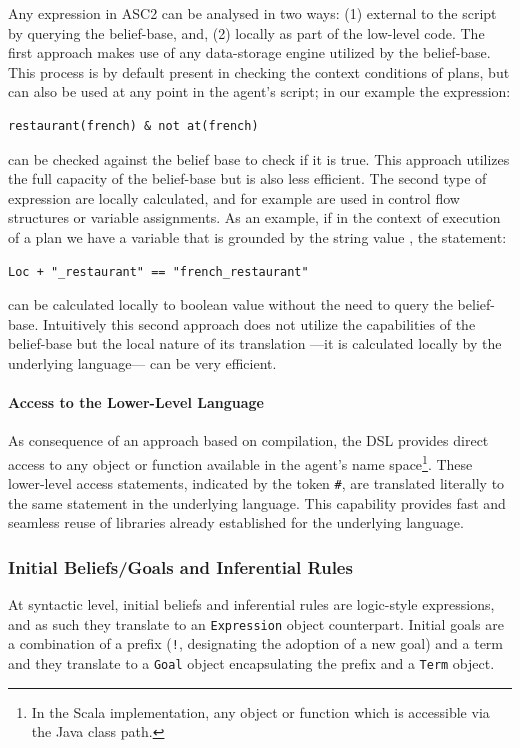 Any expression in ASC2 can be analysed in two ways: (1) external to the script by querying the belief-base, and, (2) locally as part of the low-level code. The first approach makes use of any data-storage engine utilized by the belief-base. This process is by default present in checking the context conditions of plans, but can also be used at any point in the agent's script; in our example the expression:
\begin{verbatim}
restaurant(french) & not at(french)
\end{verbatim}
\noindent can be checked against the belief base to check if it is true. This approach utilizes the full capacity of the belief-base but is also less efficient. The second type of expression are locally calculated, and for example are used in control flow structures  or variable assignments. As an example, if in the context of execution of a plan we have a variable  that is grounded by the string value , the statement:
\begin{verbatim}
Loc + "_restaurant" == "french_restaurant"
\end{verbatim}
\noindent can be calculated locally to boolean value  without the need to query the belief-base. Intuitively this second approach does not utilize the capabilities of the belief-base but the local nature of its translation ---it is calculated locally by the underlying language--- can be very efficient.

\paragraph{Access to the Lower-Level Language} As consequence of an approach based on compilation, the DSL provides direct access to any object or function available in the agent's name space\footnote{In the Scala implementation, any object or function which is accessible via the Java class path.}. These lower-level access statements, indicated by the token \verb+#+, are translated literally to the same statement in the underlying language. This capability provides fast and seamless reuse of libraries already established for the underlying language.


\subsubsection{Initial Beliefs/Goals and Inferential Rules}
At syntactic level, initial beliefs and inferential rules are logic-style expressions, and as such they translate to an \verb+Expression+ object counterpart. Initial goals are a combination of a prefix (\verb+!+, designating the adoption of a new goal)
and a term and they translate to a \verb+Goal+ object encapsulating the prefix and a \verb+Term+ object.

